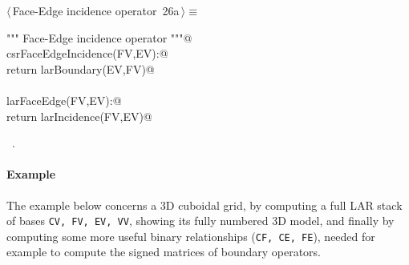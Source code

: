 \documentclass[11pt,oneside]{article}    %
\begin{document}
\begin{flushleft} \small \label{scrap42}
\protect{}$\langle\,$Face-Edge incidence operator\nobreak\ {\footnotesize 26a}$\,\rangle\equiv$
\vspace{-1ex}
\begin{list}{}{} \item
\mbox{}\verb@""" Face-Edge incidence operator """@\\
\mbox{}\verb@def csrFaceEdgeIncidence(FV,EV):@\\
\mbox{}\verb@    return larBoundary(EV,FV)@\\
\mbox{}\verb@@\\
\mbox{}\verb@def larFaceEdge(FV,EV):@\\
\mbox{}\verb@    return larIncidence(FV,EV)@\\
\mbox{}\verb@@{\NWsep}
\end{list}
\vspace{-1ex}
\footnotesize\addtolength{\baselineskip}{-1ex}
\begin{list}{}{\setlength{\itemsep}{-\parsep}\setlength{\itemindent}{-\leftmargin}}
\item \NWtxtMacroRefIn\ .
\end{list}
\end{flushleft}


\paragraph{Example}
The example below concerns a 3D cuboidal grid, by computing a full LAR stack of bases
\texttt{CV, FV, EV, VV}, showing its fully numbered 3D model, and finally by computing
some more useful binary relationships (\texttt{CF, CE, FE}), needed for example to compute the signed matrices of boundary operators.
\end{document}
